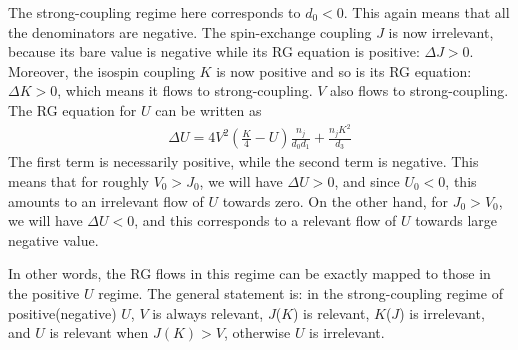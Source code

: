 The strong-coupling regime here corresponds to \(d_0 < 0\). This again means that all the denominators are negative. The spin-exchange coupling \(J\) is now irrelevant, because its bare value is negative while its RG equation is positive: \(\Delta J>0\). Moreover, the isospin coupling \(K\) is now positive and so is its RG equation: \(\Delta K>0\), which means it flows to strong-coupling. \(V\) also flows to strong-coupling. The RG equation for \(U\) can be written as
\begin{equation}\begin{aligned}
	\Delta U = 4V^2\left(\frac{K}{4} - U\right)\frac{n_j}{d_0 d_1} + \frac{n_j K^2}{d_3}
\end{aligned}\end{equation}
The first term is necessarily positive, while the second term is negative. This means that for roughly \(V_0 > J_0\), we  will have \(\Delta U > 0\), and since \(U_0 < 0\), this amounts to an irrelevant flow of \(U\) towards zero. On the other hand, for \(J_0 > V_0\), we will have \(\Delta U < 0\), and this corresponds to a relevant flow of \(U\) towards large negative value.

In other words, the RG flows in this regime can be exactly mapped to those in the positive \(U\) regime. The general statement is: in the strong-coupling regime of positive(negative) \(U\), \(V\) is always relevant, \(J\)(\(K\)) is relevant, \(K\)(\(J\)) is irrelevant, and \(U\) is relevant when \(J(K) > V\), otherwise \(U\) is irrelevant.


